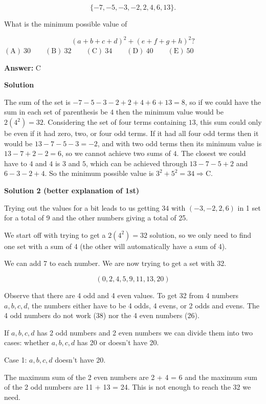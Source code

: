 \begin{enumerate}
 
 \[\{-7,-5,-3,-2,2,4,6,13\}.\]


 What is the minimum possible value of


 
 \[(a+b+c+d)^{2}+(e+f+g+h)^{2}?\]
$\mathrm{(A)}\ 30     \qquad \mathrm{(B)}\ 32     \qquad \mathrm{(C)}\ 34     \qquad \mathrm{(D)}\ 40     \qquad \mathrm{(E)}\ 50$

 \textbf{Answer: }C



\textbf{Solution}

The sum of the set is $-7-5-3-2+2+4+6+13=8$, so if we could have the sum in each set of parenthesis be $4$ then the minimum value would be $2(4^2)=32$. Considering the set of four terms containing $13$, this sum could only be even if it had zero, two, or four odd terms. If it had all four odd terms then it would be $13-7-5-3=-2$, and with two odd terms then its minimum value is $13-7+2-2=6$, so we cannot achieve two sums of $4$. The closest we could have to $4$ and $4$ is $3$ and $5$, which can be achieved through $13-7-5+2$ and $6-3-2+4$. So the minimum possible value is $3^2+5^2=34\Rightarrow\boxed{\mathrm{C}}$.

 



\textbf{Solution 2 (better explanation of 1st)}

Trying out the values for a bit leads to us getting $34$ with $(-3, -2, 2, 6)$ in 1 set for a total of 9 and the other numbers giving a total of 25. 

 We start off with trying to get a $2(4^2) = 32$ solution, so we only need to find one set with a sum of 4 (the other will automatically have a sum of 4). 

 We can add 7 to each number. We are now trying to get a set with 32.

 
 \[(0, 2, 4, 5, 9, 11, 13, 20)\]

 Observe that there are 4 odd and 4 even values. To get 32 from 4 numbers $a,b,c,d$, the numbers either have to be 4 odds, 4 evens, or 2 odds and evens. The 4 odd numbers do not work (38) nor the 4 even numbers (26). 

 If $a,b,c,d$ has 2 odd numbers and 2 even numbers we can divide them into two cases: whether $a,b,c,d$ has 20 or doesn't have 20.

 Case 1: $a,b,c,d$ doesn't have 20.

 The maximum sum of the 2 even numbers are 2 + 4 = 6 and the maximum sum of the 2 odd numbers are 11 + 13 = 24. This is not enough to reach the 32 we need.


\end{enumerate}
